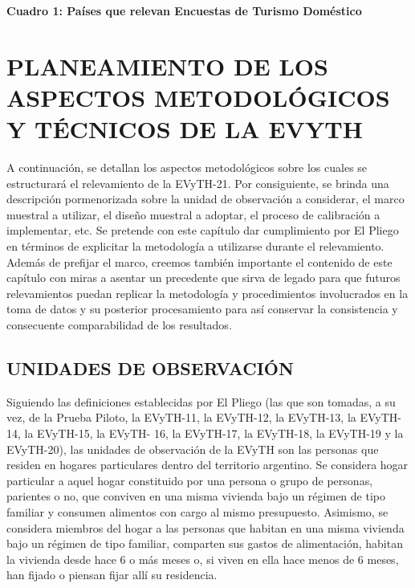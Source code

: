 \documentclass[
  openany]{book}
\begin{document}
\textbf{Cuadro 1: Países que relevan Encuestas de Turismo Doméstico}

\hypertarget{planeamiento-de-los-aspectos-metodoluxf3gicos-y-tuxe9cnicos-de-la-evyth}{%
\chapter{\texorpdfstring{\textbf{PLANEAMIENTO DE LOS ASPECTOS METODOLÓGICOS Y TÉCNICOS DE LA EVYTH}}{PLANEAMIENTO DE LOS ASPECTOS METODOLÓGICOS Y TÉCNICOS DE LA EVYTH}}\label{planeamiento-de-los-aspectos-metodoluxf3gicos-y-tuxe9cnicos-de-la-evyth}}

A continuación, se detallan los aspectos metodológicos sobre los cuales se estructurará el relevamiento de la EVyTH-21.
Por consiguiente, se brinda una descripción pormenorizada sobre la unidad de observación a considerar, el marco muestral a utilizar, el diseño muestral a adoptar, el proceso de calibración a implementar, etc.
Se pretende con este capítulo dar cumplimiento por El Pliego en términos de explicitar la metodología a utilizarse durante el relevamiento.
Además de prefijar el marco, creemos también importante el contenido de este capítulo con miras a asentar un precedente que sirva de legado para que futuros relevamientos puedan replicar la metodología y procedimientos involucrados en la toma de datos y su posterior procesamiento para así conservar la consistencia y consecuente comparabilidad de los resultados.

\hypertarget{unidades-de-observaciuxf3n}{%
\section{\texorpdfstring{\textbf{UNIDADES DE OBSERVACIÓN}}{UNIDADES DE OBSERVACIÓN}}\label{unidades-de-observaciuxf3n}}

Siguiendo las definiciones establecidas por El Pliego (las que son tomadas, a su vez, de la Prueba Piloto, la EVyTH-11, la EVyTH-12, la EVyTH-13, la EVyTH-14, la EVyTH-15, la EVyTH- 16, la EVyTH-17, la EVyTH-18, la EVyTH-19 y la EVyTH-20), las unidades de observación de la EVyTH son las personas que residen en hogares particulares dentro del territorio argentino.
Se considera hogar particular a aquel hogar constituido por una persona o grupo de personas, parientes o no, que conviven en una misma vivienda bajo un régimen de tipo familiar y consumen alimentos con cargo al mismo presupuesto.
Asimismo, se considera miembros del hogar a las personas que habitan en una misma vivienda bajo un régimen de tipo familiar, comparten sus gastos de alimentación, habitan la vivienda desde hace 6 o más meses o, si viven en ella hace menos de 6 meses, han fijado o piensan fijar allí su residencia.
\end{document}
